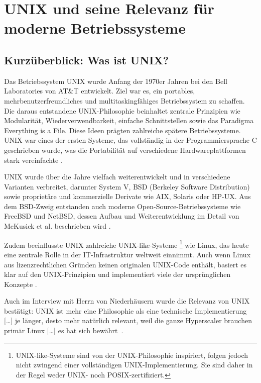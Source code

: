 \section{UNIX und seine Relevanz für moderne Betriebssysteme}


\subsection{Kurzüberblick: Was ist UNIX?}

Das Betriebssystem UNIX wurde Anfang der 1970er Jahren bei den Bell Laboratories von AT\&T entwickelt. Ziel war es, ein portables, mehrbenutzerfreundliches und
multitaskingfähiges Betriebssystem zu schaffen. Die daraus entstandene UNIX-Philosophie beinhaltet zentrale Prinzipien wie Modularität, Wiederverwendbarkeit,
einfache Schnittstellen sowie das Paradigma \glqq Everything is a File\grqq. Diese Ideen prägten zahlreiche spätere Betriebssysteme. UNIX war eines der ersten
Systeme, das vollständig in der Programmiersprache C geschrieben wurde, was die Portabilität auf verschiedene Hardwareplattformen stark vereinfachte
\cite{ModernOS}.

UNIX wurde über die Jahre vielfach weiterentwickelt und in verschiedene Varianten verbreitet, darunter System V, BSD (Berkeley Software Distribution) sowie
proprietäre und kommerzielle Derivate wie AIX, Solaris oder HP-UX. Aus dem BSD-Zweig entstanden auch moderne Open-Source-Betriebssysteme wie FreeBSD und NetBSD,
dessen Aufbau und Weiterentwicklung im Detail von McKusick et al. beschrieben wird \cite{FreeBSDOS}.

Zudem beeinflusste UNIX zahlreiche \glqq UNIX-like\grqq-Systeme \footnote{UNIX-like-Systeme sind von der UNIX-Philosophie inspiriert, folgen jedoch nicht zwingend
einer vollständigen UNIX-Implementierung. Sie sind daher in der Regel weder UNIX- noch POSIX-zertifiziert.} wie Linux, das heute eine zentrale Rolle in der
IT-Infrastruktur weltweit einnimmt. Auch wenn Linux aus lizenzrechtlichen Gründen keinen originalen UNIX-Code enthält, basiert es klar auf den UNIX-Prinzipien und
implementiert viele der ursprünglichen Konzepte \cite{ArtOfUnixProgramming}.

Auch im Interview mit Herrn von Niederhäusern wurde die Relevanz von UNIX bestätigt: \glqq UNIX ist mehr eine Philosophie als eine technische Implementierung
[\ldots] je länger, desto mehr natürlich relevant, weil die ganze Hyperscaler brauchen primär Linux [\ldots] es hat sich bewährt\grqq \ \cite{interviewNH}.



